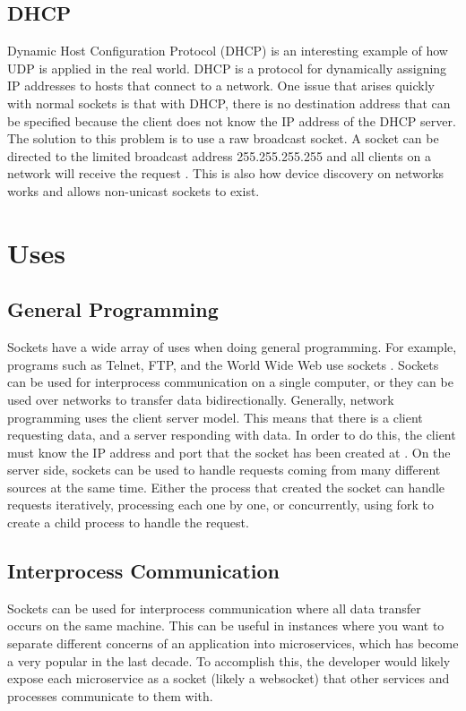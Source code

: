 \documentclass[conference, 12pt]{IEEEtran}
\begin{document}
\subsection{DHCP}
Dynamic Host Configuration Protocol (DHCP) is an interesting example of how UDP is applied in the real world. DHCP is a protocol for dynamically assigning IP addresses to hosts that connect to a network. One issue that arises quickly with normal sockets is that with DHCP, there is no destination address that can be specified because the client does not know the IP address of the DHCP server. The solution to this problem is to use a raw broadcast socket. A socket can be directed to the limited broadcast address 255.255.255.255 and all clients on a network will receive the request \cite{goldlust_2018}. This is also how device discovery on networks works and allows non-unicast sockets to exist.

\section{Uses}
\subsection{General Programming}
Sockets have a wide array of uses when doing general programming. For example, programs such as Telnet, FTP, and the World Wide Web use sockets \cite{mitchell2001advanced}. Sockets can be used for interprocess communication on a single computer, or they can be used over networks to transfer data bidirectionally. Generally, network programming uses the client server model. This means that there is a client requesting data, and a server responding with data. In order to do this, the client must know the IP address and port that the socket has been created at \cite{sawant2013network}. On the server side, sockets can be used to handle requests coming from many different sources at the same time. Either the process that created the socket can handle requests iteratively, processing each one by one, or concurrently, using fork to create a child process to handle the request. 

\subsection{Interprocess Communication}
Sockets can be used for interprocess communication where all data transfer occurs on the same machine. This can be useful in instances where you want to separate different concerns of an application into microservices, which has become a very popular in the last decade. To accomplish this, the developer would likely expose each microservice as a socket (likely a websocket) that other services and processes communicate to them with.
\end{document}
